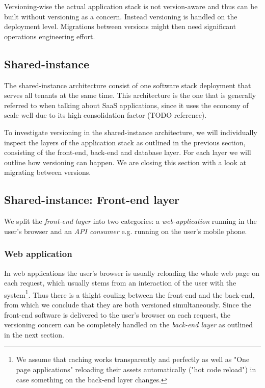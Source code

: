 Versioning-wise the actual application stack is not version-aware and thus can be built without versioning as a concern. Instead versioning is handled on the deployment level. Migrations between versions might then need significant operations engineering effort.

\subsection{Shared-instance}

The shared-instance architecture consist of one software stack deployment that serves all tenants at the same time. This architecture is the one that is generally referred to when talking about SaaS applications, since it uses the economy of scale well due to its high consolidation factor (TODO reference).

To investigate versioning in the shared-instance architecture, we will individually inspect the layers of the application stack as outlined in the previous section, consisting of the front-end, back-end and database layer. For each layer we will outline how versioning can happen. We are closing this section with a look at migrating between versions.

\subsection{Shared-instance: Front-end layer}
\label{sec:sharedfrontend}

We split the \emph{front-end layer} into two categories: a \emph{web-application} running in the user's browser and an \emph{API consumer} e.g. running on the user's mobile phone.

\subsubsection{Web application} In web applications the user's browser is usually reloading the whole web page on each request, which usually stems from an interaction of the user with the system\footnote{We assume that caching works transparently and perfectly as well as "One page applications" reloading their assets automatically ("hot code reload") in case something on the back-end layer changes.}. Thus there is a thight couling between the front-end and the back-end, from which we conclude that they are both versioned simultaneously. Since the front-end software is delivered to the user's browser on each request, the versioning concern can be completely handled on the \emph{back-end layer} as outlined in the next section.

